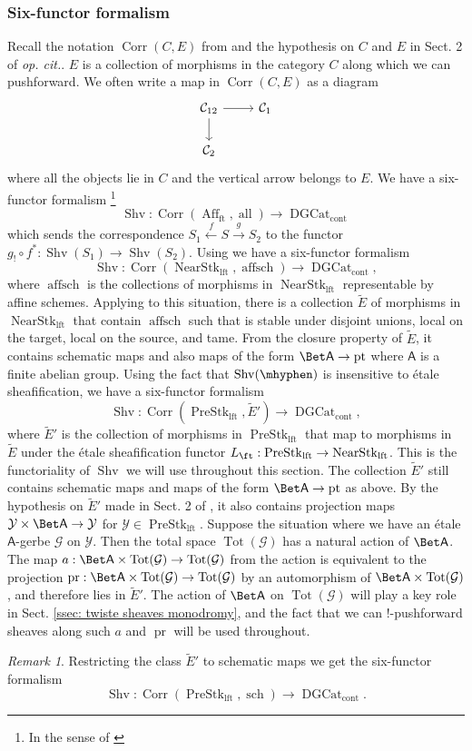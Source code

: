 \documentclass[10pt]{amsart}
\newcommand{\sssec}{\subsubsection}
\theoremstyle{remark}
\newtheorem{rmk}[subsubsection]{Remark}
\newcommand{\wt}{\widetilde}
\newcommand{\on}{\operatorname}
\newcommand{\cC}{\mathcal{C}}
\newcommand{\cG}{\mathcal{G}}
\newcommand{\cY}{\mathcal{Y}}
\newcommand{\DGcat}{\on{DGCat}_{\on{cont}}}
\newcommand{\Shv}{\on{Shv}}
\newcommand{\PreStklft}{\on{PreStk}_{\on{lft}}}
\newcommand{\NearStklft}{\on{NearStk}_{\on{lft}}}
\newcommand{\Affft}{\on{Aff}_{\on{ft}}}
\DeclareMathOperator{\pr}{pr}
\newcommand{\pt}{\on{pt}}
\newcommand{\sfA}{\mathsf{A}}
\newcommand{\Corr}{\on{Corr}}
\begin{document}
\sssec{Six-functor formalism}\label{sssec: six functor stacky}
Recall the notation $\Corr(C,E)$ from \cite{Sch} and the hypothesis on $C$ and $E$ in Sect. 2 of \emph{op. cit.}. $E$ is a collection of morphisms in the category $C$ along which we can pushforward. We often write a map in $\Corr(C,E)$ as a diagram
\[\begin{tikzcd}
	{\cC_{12}} & {\cC_1} \\
	{\cC_2}
	\arrow[from=1-1, to=1-2]
	\arrow[from=1-1, to=2-1]
\end{tikzcd}\]
where all the objects lie in $C$ and the vertical arrow belongs to $E$. We have a six-functor formalism \footnote{In the sense of \cite{Sch}}
\[\Shv: \Corr(\Affft,\on{all})\rightarrow\DGcat \]
which sends the correspondence $S_1\xleftarrow{f} S\xrightarrow{g} S_2$ to the functor $g_!\circ f^*:\Shv(S_1)\rightarrow\Shv(S_2)$. Using \cite[Proposition A.5.16]{Man} we have a six-functor formalism
\[\Shv:\Corr(\NearStklft,\on{affsch})\rightarrow \DGcat,\]
where $\on{affsch}$ is the collections of morphisms in $\NearStklft$ representable by affine schemes. Applying \cite[Theorem 5.19]{Sch} to this situation, there is a collection $\wt{E}$ of morphisms in $\NearStklft$ that contain $\on{affsch}$ such that is stable under disjoint unions, local on the target,
local on the source, and tame. From the closure property of $\wt{E}$, it contains schematic maps and also maps of the form $\Bet \sfA\rightarrow \pt$ where $\sfA$ is a finite abelian group. Using the fact that $\Shv(\mhyphen)$ is insensitive to 
\'etale sheafification, we have a six-functor formalism
\[\Shv:\Corr(\PreStklft, \wt{E}')\rightarrow \DGcat,\]
where $\wt{E}'$ is the collection of morphisms in $\PreStklft$ that map to morphisms in $\wt{E}$ under the \'etale sheafification functor $L_{\ft}:\PreStklft\rightarrow \NearStklft$. This is the functoriality of $\Shv$ we will use throughout this section. The collection $\wt{E}'$ still contains schematic maps and maps of the form $\Bet \sfA\rightarrow \pt$ as above. By the hypothesis on $\wt{E}'$ made in Sect. 2 of \cite{Sch}, it also contains projection maps $\cY\times\Bet \sfA\rightarrow\cY$ for $\cY\in\PreStklft$. Suppose the situation where we have an \'etale $\sfA$-gerbe $\cG$ on $\cY$. Then the total space $\on{Tot}(\cG)$ has a natural action of $\Bet \sfA$. The map $a:\Bet\sfA\times\on{Tot}(\cG)\rightarrow \on{Tot}(\cG)$ from the action is equivalent to the projection $\pr: \Bet\sfA\times \on{Tot}(\cG)\rightarrow \on{Tot}(\cG)$ by an automorphism of $\Bet\sfA\times \on{Tot}(\cG)$, and therefore lies in $\wt{E}'$. The action of $\Bet \sfA$ on $\on{Tot}(\cG)$ will play a key role in Sect. \ref{ssec: twiste sheaves monodromy}, and the fact that we can $!$-pushforward sheaves along such $a$ and $\pr$ will be used throughout.
\begin{rmk}
    Restricting the class $\wt{E}'$ to schematic maps we get the six-functor formalism
\[\Shv:\Corr(\PreStklft,\on{sch})\rightarrow\DGcat.\]
\end{rmk}
\end{document}
